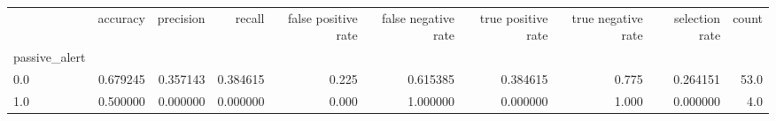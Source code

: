 \begin{tabular}{lrrrrrrrrr}
\toprule
{} &  accuracy &  precision &    recall &  false positive rate &  false negative rate &  true positive rate &  true negative rate &  selection rate &  count \\
passive\_alert &           &            &           &                      &                      &                     &                     &                 &        \\
\midrule
0.0           &  0.679245 &   0.357143 &  0.384615 &                0.225 &             0.615385 &            0.384615 &               0.775 &        0.264151 &   53.0 \\
1.0           &  0.500000 &   0.000000 &  0.000000 &                0.000 &             1.000000 &            0.000000 &               1.000 &        0.000000 &    4.0 \\
\bottomrule
\end{tabular}
